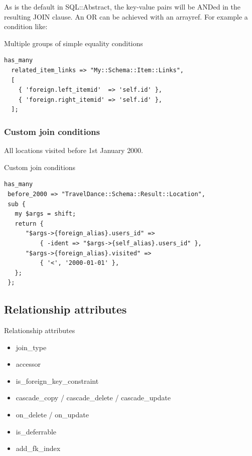As is the default in SQL::Abstract, the key-value pairs will be ANDed in the
resulting JOIN clause. An OR can be achieved with an arrayref. For example a
condition like:

\begin{frame}[fragile]{Multiple groups of simple equality conditions}
\begin{lstlisting}
has_many
  related_item_links => "My::Schema::Item::Links",
  [
    { 'foreign.left_itemid'  => 'self.id' },
    { 'foreign.right_itemid' => 'self.id' },
  ];
\end{lstlisting}
\end{frame}

\subsubsection{Custom join conditions}

All locations visited before 1st January 2000.

\begin{frame}[fragile]{Custom join conditions}
\begin{lstlisting}
has_many
 before_2000 => "TravelDance::Schema::Result::Location",
 sub {
   my $args = shift;
   return {
      "$args->{foreign_alias}.users_id" =>
          { -ident => "$args->{self_alias}.users_id" },
      "$args->{foreign_alias}.visited" =>
          { '<', '2000-01-01' },
   };
 };
\end{lstlisting}
\end{frame}

\subsection{Relationship attributes}


\begin{frame}{Relationship attributes}
\begin{itemize}
\item join\_type
\item accessor
\item is\_foreign\_key\_constraint
\item cascade\_copy / cascade\_delete / cascade\_update
\item on\_delete / on\_update
\item is\_deferrable
\item add\_fk\_index
\end{itemize}
\end{frame}

